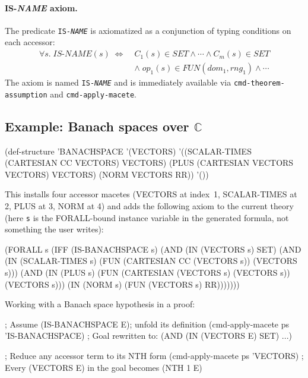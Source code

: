 \documentclass{amsbook}[openany]
\theoremstyle{definition}
\theoremstyle{remark}
\theoremstyle{remark}
\begin{document}
\paragraph{IS-\textit{NAME} axiom.}
The predicate \texttt{IS-\textit{NAME}} is axiomatized as a conjunction
of typing conditions on each accessor:
\begin{align*}
  \forall s.\;\mathit{IS\text{-}NAME}(s) \;\Leftrightarrow\; &
  C_1(s) \in \mathit{SET} \land \cdots \land C_m(s) \in \mathit{SET}\\
  &\land\; \mathit{op}_1(s) \in \mathit{FUN}(\mathit{dom}_1, \mathit{rng}_1)
  \land \cdots
\end{align*}
The axiom is named \texttt{IS-\textit{NAME}} and is immediately available
via \texttt{cmd-theorem-assumption} and \texttt{cmd-apply-macete}.

\subsection{Example: Banach spaces over \texorpdfstring{$\mathbb{C}$}{CC}}

\begin{VNBcode}
(def-structure 'BANACHSPACE
  '(VECTORS)
  '((SCALAR-TIMES (CARTESIAN CC VECTORS) VECTORS)
    (PLUS         (CARTESIAN VECTORS VECTORS) VECTORS)
    (NORM         VECTORS RR))
  '())
\end{VNBcode}

This installs four accessor macetes (VECTORS at index~1, SCALAR-TIMES at
2, PLUS at 3, NORM at 4) and adds the following axiom to the current
theory (here \texttt{s} is the FORALL-bound instance variable in the
generated formula, not something the user writes):

\begin{VNBcode}
(FORALL s
  (IFF (IS-BANACHSPACE s)
       (AND (IN (VECTORS s) SET)
            (AND (IN (SCALAR-TIMES s)
                     (FUN (CARTESIAN CC (VECTORS s)) (VECTORS s)))
                 (AND (IN (PLUS s)
                          (FUN (CARTESIAN (VECTORS s) (VECTORS s))
                               (VECTORS s)))
                      (IN (NORM s) (FUN (VECTORS s) RR)))))))
\end{VNBcode}

Working with a Banach space hypothesis in a proof:
\begin{VNBcode}
; Assume (IS-BANACHSPACE E); unfold its definition
(cmd-apply-macete ps 'IS-BANACHSPACE)
; Goal rewritten to: (AND (IN (VECTORS E) SET) ...)

; Reduce any accessor term to its NTH form
(cmd-apply-macete ps 'VECTORS)
; Every (VECTORS E) in the goal becomes (NTH 1 E)
\end{VNBcode}
\end{document}
